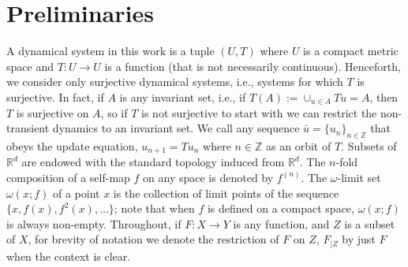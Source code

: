 \documentclass[12 pt]{article}
\begin{document}







\section{Preliminaries} \label{Sec_Prelim}


A dynamical system in this work is a tuple $(U,T)$ where $U$ is a compact metric space and $T: U \to U$ is a function (that is not necessarily continuous). Henceforth, we consider only surjective dynamical systems, i.e., systems for which $T$ is surjective. In fact, if $A$ is any invariant set, i.e., if $T(A):=\cup_{u\in A} Tu = A$,  then $T$ is surjective on $A$, so if $T$ is not surjective to start with we can restrict the non-transient dynamics to an invariant set.  We call any sequence $\bar{u} = \{u_n\}_{n\in \mathbb{Z}}$ that obeys the update equation, $u_{n+1}=Tu_n$ where $n \in \mathbb{Z}$ as an orbit of $T$. Subsets of $\mathbb{R}^d$ are endowed with the standard topology induced from 
$\mathbb{R}^d$.  The $n$-fold composition of a self-map $f$ on any space is denoted by $f^{(n)}$. The $\omega$-limit set $\omega(x;f)$ of a point $x$ is the collection of limit points of the sequence $\{x,f(x),f^{2}(x),\ldots\}$; note that when $f$ is defined on a compact space, $\omega(x;f)$ is always non-empty. Throughout, if $F: X \to Y$ is any function, and $Z$ is a subset of $X$, for brevity of notation we denote the restriction of $F$ on $Z$, $F_{|Z}$ by just $F$ when the context is clear. 
\end{document}
